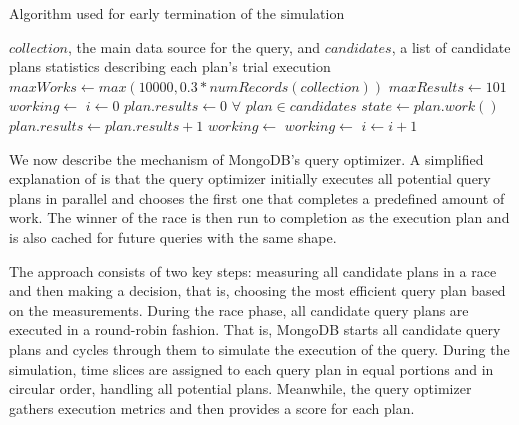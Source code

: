 \begin{algorithm}[tb]
    \caption{Algorithm used for early termination of the simulation}
    \begin{algorithmic}
        \REQUIRE $collection$, the main data source for the query, and $candidates$, a list of candidate plans
        \ENSURE statistics describing each plan's trial execution
        \STATE $maxWorks \gets max(10000, 0.3 * numRecords(collection))$
        \STATE $maxResults \gets 101$ 
        \STATE $working \gets$ \TRUE
        \STATE $i \gets 0$
        \STATE $plan.results \gets 0$ $\forall$ $plan \in candidates$
        \STATE
                \STATE $state \gets plan.work()$
                    \STATE $plan.results \gets plan.results + 1$
                        \STATE $working \gets$ \FALSE
                    \ENDIF
                    \STATE $working \gets$ \FALSE
                \ENDIF
            \ENDFOR
            \STATE $i \gets i + 1$
        \ENDWHILE
    \end{algorithmic}
    \label{alg:es}
\end{algorithm}

We now describe the mechanism of MongoDB's query optimizer. A simplified explanation of \approachName is that the query optimizer initially executes all potential query plans in parallel and chooses the first one that completes a predefined amount of work. The winner of the race is then run to completion as the execution plan and is also cached for future queries with the same shape. 

The \approachName approach consists of two key steps: measuring all candidate plans in a race and then making a decision, that is, choosing the most efficient query plan based on the measurements. During the race phase, all candidate query plans are executed in a round-robin fashion. That is, MongoDB starts all candidate query plans and cycles through them to simulate the execution of the query. During the simulation, time slices are assigned to each query plan in equal portions and in circular order, handling all potential plans. Meanwhile, the query optimizer gathers execution metrics and then provides a score for each plan. 

